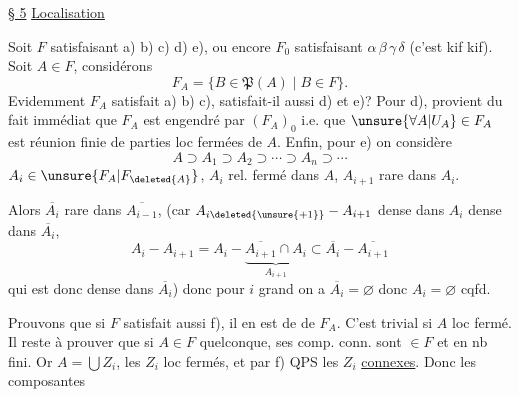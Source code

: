 
\uline{§ 5} \uline{Localisation}

Soit $F$ satisfaisant a) b) c) d) e), ou encore $F_0$ satisfaisant $\alpha\,\beta\,\gamma\,\delta$ (c'est kif kif). Soit $A\in F$, considérons
\[
F_A=\{B\in\mathfrak P(A)\mid B\in F\}.
\]
Evidemment $F_A$ satisfait a) b) c), satisfait-il aussi d) et e)? Pour d),  provient du fait immédiat que $F_A$ est engendré par $(F_A)_0$ i.e. que $\unsure{\forall A|U_A}\in F_A$ est réunion finie de parties loc fermées  de $A$.  Enfin, pour e) on considère
\[
A\supset A_1\supset A_2\supset\cdots\supset A_n\supset\cdots
\]
$A_i\in \unsure{F_A|F_{\deleted{A}}}$, $A_i$ rel. fermé dans $A$, $A_{i+1}$ rare dans $A_i$.

Alors $\overline{A_i}$ rare dans $\overline{A_{i-1}}$,  (car $A_{i\deleted{\unsure{+1}}}-A_{i+1}$ dense dans $A_i$ dense dans $\overline{A_i}$,  
\[
A_i-A_{i+1}=A_i-\underbrace{\overline{A_{i+1}}\cap A_i}_{A_{i+1}}\subset\overline{A_i}-\overline{A_{i+1}}
\]
qui est donc dense dans $\overline{A_i}$) donc pour $i$ grand on a $\overline{A_i}=\varnothing$ donc $A_i=\varnothing$ cqfd.

Prouvons que si $F$ satisfait aussi f), il en est de  de $F_A$. C'est trivial si $A$ loc fermé. Il reste à prouver que si $A\in F$ quelconque, ses comp. conn. sont $\in F$ et en nb fini. Or $A=\bigcup Z_i$, les $Z_i$ loc fermés, et par f) QPS les $Z_i$ \uline{connexes}. Donc les composantes
